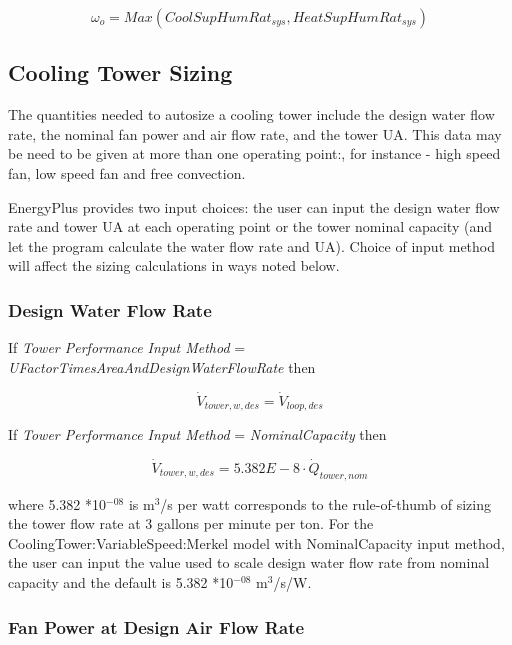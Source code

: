 \begin{equation}
  {\omega_o} = Max\left( {CoolSupHumRa{t_{sys}},HeatSupHumRa{t_{sys}}} \right)
\end{equation}

\subsection{Cooling Tower Sizing}\label{cooling-tower-sizing}

The quantities needed to autosize a cooling tower include the design water flow rate, the nominal fan power and air flow rate, and the tower UA. This data may be need to be given at more than one operating point:, for instance - high speed fan, low speed fan and free convection.

EnergyPlus provides two input choices: the user can input the design water flow rate and tower UA at each operating point or the tower nominal capacity (and let the program calculate the water flow rate and UA). Choice of input method will affect the sizing calculations in ways noted below.

\subsubsection{Design Water Flow Rate}\label{design-water-flow-rate}

If \emph{Tower Performance Input Method} = \emph{UFactorTimesAreaAndDesignWaterFlowRate} then

\begin{equation}
\dot V_{tower,w,des} = \dot V_{loop,des}
\end{equation}

If \emph{Tower Performance Input Method} = \emph{NominalCapacity} then

\begin{equation}
\dot V_{tower,w,des} = 5.382E - 8\cdot \dot Q_{tower,nom}
\end{equation}

where 5.382 *10\(^{-08}\) is m\(^{3}\)/s per watt corresponds to the rule-of-thumb of sizing the tower flow rate at 3 gallons per minute per ton. For the CoolingTower:VariableSpeed:Merkel model with NominalCapacity input method, the user can input the value used to scale design water flow rate from nominal capacity and the default is 5.382 *10\(^{-08}\) m\(^{3}\)/s/W.

\subsubsection{Fan Power at Design Air Flow Rate}\label{fan-power-at-design-air-flow-rate}

